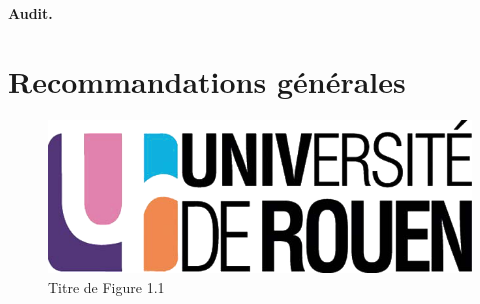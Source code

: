 		
		
		\paragraph{Audit.\\}




\section{Recommandations générales}




\begin{figure}[H]
	\centering
	\includegraphics[scale=0.2]{images/logo_univ.png}
	\caption{Titre de Figure 1.1}
	\label{fig1}
\end{figure}